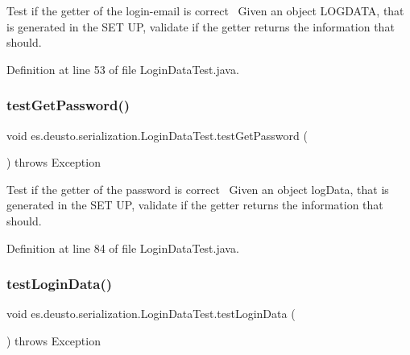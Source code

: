 Test if the getter of the login-\/email is correct~\newline
Given an object L\+O\+G\+D\+A\+TA, that is generated in the S\+ET UP, validate if the getter returns the information that should. 

Definition at line 53 of file Login\+Data\+Test.\+java.

\mbox{\label{classes_1_1deusto_1_1serialization_1_1_login_data_test_a7686b5fb1a89b9e0a5e8fa20dfc0fdee}} 
\subsubsection{\texorpdfstring{test\+Get\+Password()}{testGetPassword()}}
{\footnotesize\ttfamily void es.\+deusto.\+serialization.\+Login\+Data\+Test.\+test\+Get\+Password (\begin{DoxyParamCaption}{ }\end{DoxyParamCaption}) throws Exception}

Test if the getter of the password is correct~\newline
Given an object log\+Data, that is generated in the S\+ET UP, validate if the getter returns the information that should. 

Definition at line 84 of file Login\+Data\+Test.\+java.

\mbox{\label{classes_1_1deusto_1_1serialization_1_1_login_data_test_a74ecd0b9656b109638fc4949d589dc81}} 
\subsubsection{\texorpdfstring{test\+Login\+Data()}{testLoginData()}}
{\footnotesize\ttfamily void es.\+deusto.\+serialization.\+Login\+Data\+Test.\+test\+Login\+Data (\begin{DoxyParamCaption}{ }\end{DoxyParamCaption}) throws Exception}

